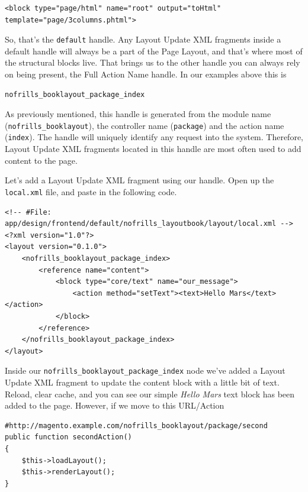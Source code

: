 \documentclass[oneside]{book}
\begin{document}
\begin{lstlisting}
<block type="page/html" name="root" output="toHtml"
template="page/3columns.phtml">

\end{lstlisting}


So, that's the \footnotesize\texttt{default} \normalsize  handle.  Any Layout Update XML fragments inside a default handle will always be a part of the Page Layout, and that's where most of the structural blocks live.  That brings us to the other handle you can always rely on being present, the Full Action Name handle.  In our examples above this is

\begin{lstlisting}
nofrills_booklayout_package_index

\end{lstlisting}


As previously mentioned, this handle is generated from the module name (\footnotesize\texttt{nofrills\_booklayout}\normalsize), the controller name (\footnotesize\texttt{package}\normalsize) and the action name (\footnotesize\texttt{index}\normalsize).  The handle will uniquely identify any request into the system.  Therefore, Layout Update XML fragments located in this handle are most often used to add content to the page.  

Let's add a Layout Update XML fragment using our handle.  Open up the \footnotesize\texttt{local.xml} \normalsize  file, and paste in the following code.

\begin{lstlisting}
<!-- #File: app/design/frontend/default/nofrills_layoutbook/layout/local.xml -->
<?xml version="1.0"?>
<layout version="0.1.0">
    <nofrills_booklayout_package_index>
        <reference name="content">
            <block type="core/text" name="our_message">
                <action method="setText"><text>Hello Mars</text></action>
            </block>
        </reference>
    </nofrills_booklayout_package_index>
</layout>

\end{lstlisting}


Inside our \footnotesize\texttt{nofrills\_booklayout\_package\_index} \normalsize  node we've added a Layout Update XML fragment to update the content block with a little bit of text.  Reload, clear cache, and you can see our simple \emph{Hello Mars} text block has been added to the page.  However, if we move to this URL/Action 

\begin{lstlisting}
#http://magento.example.com/nofrills_booklayout/package/second
public function secondAction()
{
    $this->loadLayout();
    $this->renderLayout();          
}

\end{lstlisting}
\end{document}
